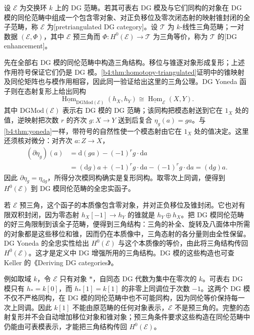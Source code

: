 \begin{definition}\label{b4:def:dg-enhancement}
	设 \(\mathcal E\) 为交换环 \(k\) 上的 DG 范畴。若其可表右 DG 模及与它们同构的对象在 DG 模的同伦范畴中组成一个包含零对象、对正负移位及零次闭态射的映射锥封闭的全子范畴，称 \(\mathcal E\) 为[pretriangulated DG category]。设 \(\mathcal T\) 为 \(k\)-线性三角范畴；一对数据 \((\mathcal E,\Phi)\)，其中 \(\mathcal E\) 预三角而 \(\Phi:H^0(\mathcal E)\to\mathcal T\) 为三角等价，称为 \(\mathcal T\) 的[DG enhancement]。
\end{definition}

先在全部右 DG 模的同伦范畴中构造三角结构。移位与锥逐对象形成复形；上述作用符号保证它们仍是 DG 模。\cref{b4:thm:homotopy-triangulated}证明中的锥映射及同伦矩阵也与模作用相容，因此同一验证给出这里的三角公理。DG Yoneda 函子则在态射复形上给出同构
\[
	\underline{\operatorname{Hom}}_{\mathrm{DGMod}(\mathcal E)}(h_X,h_Y) \cong\underline{\operatorname{Hom}}_{\mathcal E}(X,Y).
\]
其中 \(\mathrm{DGMod}(\mathcal E)\) 表示右 DG 模的 DG 范畴；该同构把模态射送到它在 \(1_X\) 处的值，逆映射把次数 \(r\) 的齐次 \(g:X\to Y\) 送到后复合 \(\eta_g(a)=ga\)。与\cref{b4:thm:yoneda}一样，带符号的自然性使一个模态射由它在 \(1_X\) 处的值决定。这里还须核对微分：对齐次 \(a:Z\to X\)，
\[
	\begin{aligned}
		(\partial\eta_g)(a) &=\mathrm{d}(ga)-(-1)^r g\cdot\mathrm{d}a\\
		&=(\mathrm{d}g)a+(-1)^r g\cdot\mathrm{d}a-(-1)^r g\cdot\mathrm{d}a =(\mathrm{d}g)a.
	\end{aligned}
\]
因此 \(\partial\eta_g=\eta_{\mathrm{d}g}\)，所得分次模同构确实是复形同构。取零次上同调，便得到 \(H^0(\mathcal E)\) 到 DG 模同伦范畴的全忠实函子。

\ProseParagraphBreak
若 \(\mathcal E\) 预三角，这个函子的本质像包含零对象，并对正负移位及锥封闭。它也对有限双积封闭，因为零态射 \(h_X[-1]\to h_Y\) 的锥就是 \(h_Y\oplus h_X\)。把 DG 模同伦范畴的好三角限制到该全子范畴，便得到三角结构：三角的补全、旋转及八面体中所需的对象都是这些移位和锥，因而仍在本质像中，三角态射的各分量则由全性保留。DG Yoneda 的全忠实性给出 \(H^0(\mathcal E)\) 与这个本质像的等价，由此将三角结构传回 \(H^0(\mathcal E)\)。这才是定义中 DG 增强所用的三角结构。DG 模的这些构造也可查 Keller 的《Deriving DG categories》\cite[Sections 1.2 and 2.2]{Keller1994DerivingDG}。

\ProseParagraphBreak
例如取域 \(k\)，令 \(\mathcal E\) 只有对象 \(*\)，自同态 DG 代数为集中在零次的 \(k\)。可表右 DG 模只有 \(h_*=k[0]\)，而 \(h_*[1]=k[1]\) 的非零上同调位于次数 \(-1\)。这两个 DG 模不仅不严格同构，在 DG 模的同伦范畴中也不可能同构，因为同伦等价保持每一次上同调。因此 \(k[1]\) 不能由原范畴的任何对象表示，\(\mathcal E\) 不是预三角的。完整的态射复形并不会自动增加移位对象和锥对象；预三角条件要求这些构造在同伦范畴中仍能由可表模表示，才能把三角结构传回 \(H^0(\mathcal E)\)。

